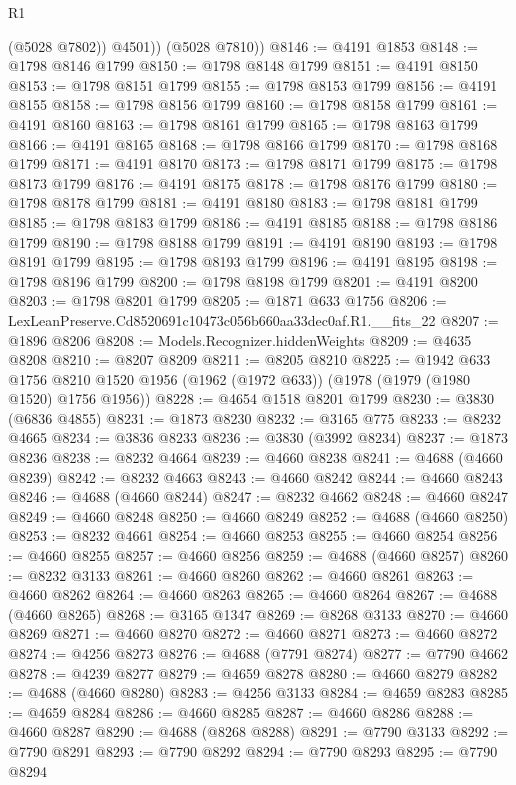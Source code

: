\begin{lexlean}{R1}
\begin{coremodule}
            (@5028 @7802))
          @4501))
      (@5028 @7810))
@8146 := @4191 @1853
@8148 := @1798 @8146 @1799
@8150 := @1798 @8148 @1799
@8151 := @4191 @8150
@8153 := @1798 @8151 @1799
@8155 := @1798 @8153 @1799
@8156 := @4191 @8155
@8158 := @1798 @8156 @1799
@8160 := @1798 @8158 @1799
@8161 := @4191 @8160
@8163 := @1798 @8161 @1799
@8165 := @1798 @8163 @1799
@8166 := @4191 @8165
@8168 := @1798 @8166 @1799
@8170 := @1798 @8168 @1799
@8171 := @4191 @8170
@8173 := @1798 @8171 @1799
@8175 := @1798 @8173 @1799
@8176 := @4191 @8175
@8178 := @1798 @8176 @1799
@8180 := @1798 @8178 @1799
@8181 := @4191 @8180
@8183 := @1798 @8181 @1799
@8185 := @1798 @8183 @1799
@8186 := @4191 @8185
@8188 := @1798 @8186 @1799
@8190 := @1798 @8188 @1799
@8191 := @4191 @8190
@8193 := @1798 @8191 @1799
@8195 := @1798 @8193 @1799
@8196 := @4191 @8195
@8198 := @1798 @8196 @1799
@8200 := @1798 @8198 @1799
@8201 := @4191 @8200
@8203 := @1798 @8201 @1799
@8205 := @1871 @633 @1756
@8206 := LexLeanPreserve.Cd8520691c10473c056b660aa33dec0af.R1.__fits_22
@8207 := @1896 @8206
@8208 := Models.Recognizer.hiddenWeights
@8209 := @4635 @8208
@8210 := @8207 @8209
@8211 := @8205 @8210
@8225 := @1942
    @633
    @1756
    @8210
    @1520
    @1956
    (@1962 (@1972 @633))
    (@1978 (@1979 (@1980 @1520) @1756 @1956))
@8228 := @4654 @1518 @8201 @1799
@8230 := @3830 (@6836 @4855)
@8231 := @1873 @8230
@8232 := @3165 @775
@8233 := @8232 @4665
@8234 := @3836 @8233
@8236 := @3830 (@3992 @8234)
@8237 := @1873 @8236
@8238 := @8232 @4664
@8239 := @4660 @8238
@8241 := @4688 (@4660 @8239)
@8242 := @8232 @4663
@8243 := @4660 @8242
@8244 := @4660 @8243
@8246 := @4688 (@4660 @8244)
@8247 := @8232 @4662
@8248 := @4660 @8247
@8249 := @4660 @8248
@8250 := @4660 @8249
@8252 := @4688 (@4660 @8250)
@8253 := @8232 @4661
@8254 := @4660 @8253
@8255 := @4660 @8254
@8256 := @4660 @8255
@8257 := @4660 @8256
@8259 := @4688 (@4660 @8257)
@8260 := @8232 @3133
@8261 := @4660 @8260
@8262 := @4660 @8261
@8263 := @4660 @8262
@8264 := @4660 @8263
@8265 := @4660 @8264
@8267 := @4688 (@4660 @8265)
@8268 := @3165 @1347
@8269 := @8268 @3133
@8270 := @4660 @8269
@8271 := @4660 @8270
@8272 := @4660 @8271
@8273 := @4660 @8272
@8274 := @4256 @8273
@8276 := @4688 (@7791 @8274)
@8277 := @7790 @4662
@8278 := @4239 @8277
@8279 := @4659 @8278
@8280 := @4660 @8279
@8282 := @4688 (@4660 @8280)
@8283 := @4256 @3133
@8284 := @4659 @8283
@8285 := @4659 @8284
@8286 := @4660 @8285
@8287 := @4660 @8286
@8288 := @4660 @8287
@8290 := @4688 (@8268 @8288)
@8291 := @7790 @3133
@8292 := @7790 @8291
@8293 := @7790 @8292
@8294 := @7790 @8293
@8295 := @7790 @8294

\end{coremodule}
\end{lexlean}
